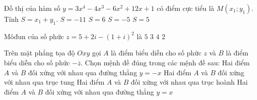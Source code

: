 \begin{ex}%
	Đồ thị của hàm số $y=3x^4-4 x^3-6x^2+12x+1$ có điểm cực tiểu là $M\left(x_1; y_1\right)$. Tính $S=x_1+y_1$.
	\choice
	{\True $S=-11$}
	{$S=6$}
	{$S=-5$}
	{$S=5$}
\end{ex}

\begin{ex}%
	Môđun của số phức $z=5+2 i-(1+i)^2$ là
	\choice
	{\True $5$}
	{$3$}
	{$4$}
	{$2$}
\end{ex}

\begin{ex}%
	Trên mặt phẳng tọa độ $Oxy$ gọi $A$ là điểm biểu diễn cho số phức $z$ và $B$ là điểm biểu diễn cho số phức $-\overline{z}$. Chọn mệnh đề đúng trong các mệnh đề sau:
	\choice
	{Hai điểm $A$ và $B$ đối xứng với nhau qua đường thẳng $y=-x$}
	{\True Hai điểm $A$ và $B$ đối xứng với nhau qua trục tung}
	{Hai điểm $A$ và $B$ đối xứng với nhau qua trục hoành}
	{Hai điểm $A$ và $B$ đối xứng với nhau qua đường thẳng $y=x$}
\end{ex}

